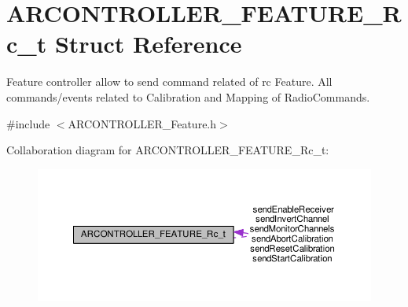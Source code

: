 \hypertarget{struct_a_r_c_o_n_t_r_o_l_l_e_r___f_e_a_t_u_r_e___rc__t}{}\section{A\+R\+C\+O\+N\+T\+R\+O\+L\+L\+E\+R\+\_\+\+F\+E\+A\+T\+U\+R\+E\+\_\+\+Rc\+\_\+t Struct Reference}
\label{struct_a_r_c_o_n_t_r_o_l_l_e_r___f_e_a_t_u_r_e___rc__t}


Feature controller allow to send command related of rc Feature. All commands/events related to Calibration and Mapping of Radio\+Commands.  




{\ttfamily \#include $<$A\+R\+C\+O\+N\+T\+R\+O\+L\+L\+E\+R\+\_\+\+Feature.\+h$>$}



Collaboration diagram for A\+R\+C\+O\+N\+T\+R\+O\+L\+L\+E\+R\+\_\+\+F\+E\+A\+T\+U\+R\+E\+\_\+\+Rc\+\_\+t\+:
\nopagebreak
\begin{figure}[H]
\begin{center}
\leavevmode
\includegraphics[width=350pt]{struct_a_r_c_o_n_t_r_o_l_l_e_r___f_e_a_t_u_r_e___rc__t__coll__graph}
\end{center}
\end{figure}
